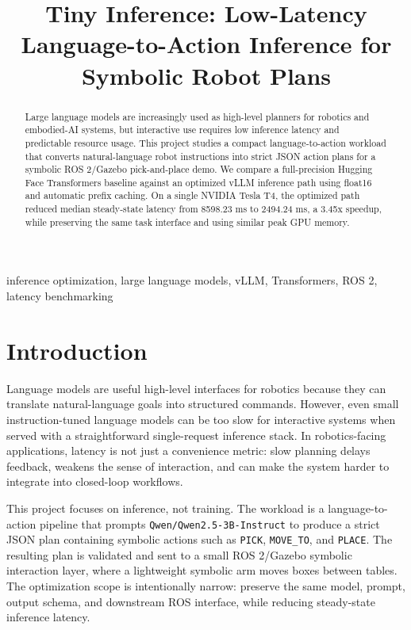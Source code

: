 \documentclass[conference]{IEEEtran}
\begin{document}
\title{Tiny Inference: Low-Latency Language-to-Action Inference for Symbolic Robot Plans}

\author{
}

\maketitle

\begin{abstract}
Large language models are increasingly used as high-level planners for robotics and embodied-AI systems, but interactive use requires low inference latency and predictable resource usage. This project studies a compact language-to-action workload that converts natural-language robot instructions into strict JSON action plans for a symbolic ROS 2/Gazebo pick-and-place demo. We compare a full-precision Hugging Face Transformers baseline against an optimized vLLM inference path using float16 and automatic prefix caching. On a single NVIDIA Tesla T4, the optimized path reduced median steady-state latency from 8598.23 ms to 2494.24 ms, a 3.45x speedup, while preserving the same task interface and using similar peak GPU memory.
\end{abstract}

\begin{IEEEkeywords}
inference optimization, large language models, vLLM, Transformers, ROS 2, latency benchmarking
\end{IEEEkeywords}

\section{Introduction}

Language models are useful high-level interfaces for robotics because they can translate natural-language goals into structured commands. However, even small instruction-tuned language models can be too slow for interactive systems when served with a straightforward single-request inference stack. In robotics-facing applications, latency is not just a convenience metric: slow planning delays feedback, weakens the sense of interaction, and can make the system harder to integrate into closed-loop workflows.

This project focuses on inference, not training. The workload is a language-to-action pipeline that prompts \texttt{Qwen/Qwen2.5-3B-Instruct} to produce a strict JSON plan containing symbolic actions such as \texttt{PICK}, \texttt{MOVE\_TO}, and \texttt{PLACE}. The resulting plan is validated and sent to a small ROS 2/Gazebo symbolic interaction layer, where a lightweight symbolic arm moves boxes between tables. The optimization scope is intentionally narrow: preserve the same model, prompt, output schema, and downstream ROS interface, while reducing steady-state inference latency.
\end{document}
